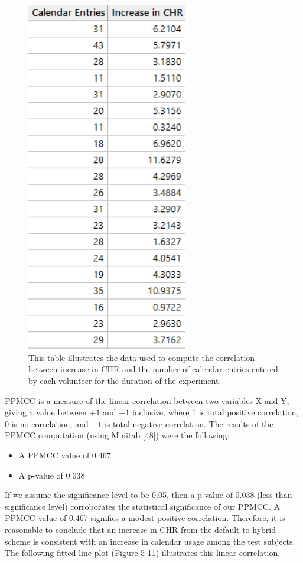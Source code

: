 \documentclass[12pt]{uthesis-v12}  %
\begin{document}
				\begin{figure}[h]
					\centering
					\includegraphics[width = 70mm]{images/calendarData.png}
					\caption[Increase in CHR vs Calendar Entries - Table]{This table illustrates the data used to compute the correlation between increase in CHR and the number of calendar entries entered by each volunteer for the duration of the experiment.}
				\end{figure}
				
				PPMCC is a measure of the linear correlation between two variables X and Y, giving a value between $+1$ and $−1$ inclusive, where 1 is total positive correlation, 0 is no correlation, and $−1$ is total negative correlation. The results of the PPMCC computation (using Minitab [48]) were the following:
				
				\begin{itemize}
					\item A PPMCC value of 0.467 
					\item A p-value of 0.038
				\end{itemize}
				
				
				 If we assume the significance level to be 0.05, then a p-value of 0.038 (less than significance level) corroborates the statistical significance of our PPMCC. A PPMCC value of 0.467 signifies a modest positive correlation. Therefore, it is reasonable to conclude that an increase in CHR from the default to hybrid scheme is consistent with an increase in calendar usage among the test subjects. The following fitted line plot (Figure 5-11) illustrates this linear correlation.
				
\end{document}
